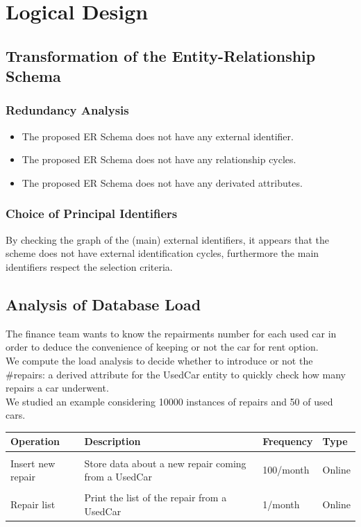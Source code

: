 \section{Logical Design}

\subsection{Transformation of the Entity-Relationship Schema}


\subsubsection{Redundancy Analysis}
\begin{itemize}
	\item The proposed ER Schema does not have any external identifier.
	\item The proposed ER Schema does not have any relationship cycles.
	\item The proposed ER Schema does not have any derivated attributes.
\end{itemize}

\subsubsection{Choice of Principal Identifiers}
By checking the graph of the (main) external identifiers, it appears that the scheme does 
not have external identification cycles, furthermore the main identifiers respect the selection criteria.
\subsection{Analysis of Database Load}
The finance team wants to know the repairments number for each used car in order to deduce the convenience of keeping or not the car for rent option.\\ 
We compute the load analysis to decide whether to introduce or not the \#repairs: a derived attribute for the UsedCar entity to quickly check how many repairs a car underwent.\\ 
We studied an example considering 10000 instances of repairs and 50 of used cars.

\newpage

\begin{longtable}{|p{}|p{}|p{}|p{}|}
	\hline
	\textbf{Operation} & \textbf{Description} & \textbf{Frequency} & \textbf{Type} \\
	\hline 
	\centering{O$_1$} \\ Insert new repair & Store data about a new repair coming from a UsedCar & 100/month & Online \\
	\hline
	\centering{O$_2$} \\ Repair list & Print the list of the repair from a UsedCar & 1/month & Online \\
	\hline
\end{longtable}

